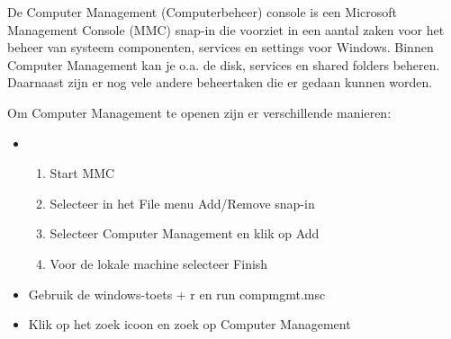 De Computer Management (Computerbeheer) console is een Microsoft Management Console (MMC) snap-in die voorziet in een aantal zaken voor het beheer van systeem componenten, services en settings voor Windows. Binnen Computer Management kan je o.a. de disk, services en shared folders beheren. Daarnaast zijn er nog vele andere beheertaken die er gedaan kunnen worden.

Om Computer Management te openen zijn er verschillende manieren:
\begin{itemize}
\item
	\begin{enumerate}
		\item Start MMC
		\item Selecteer in het File menu Add/Remove snap-in
		\item Selecteer Computer Management en klik op Add
		\item Voor de lokale machine selecteer Finish
	\end{enumerate}
\item Gebruik de windows-toets + r en run compmgmt.msc
\item Klik op het zoek icoon en zoek op Computer Management
\end{itemize}

\begin{minipage}[t]{\linewidth}
\raggedright
{}
\end{minipage}

